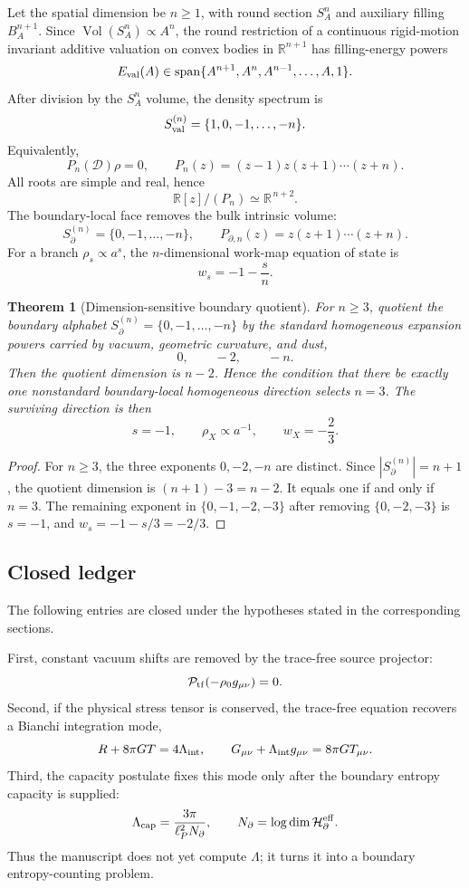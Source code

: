 \documentclass[aps,prd,reprint,nofootinbib,superscriptaddress,floatfix]{revtex4-2}
\numberwithin{equation}{section}
\theoremstyle{definition}
\theoremstyle{plain}
\newtheorem{theorem}{Theorem}[section]
\newcommand{\Dil}{\mathscr D}
\newcommand{\vol}{\operatorname{Vol}}
\newcommand{\spanop}{\operatorname{span}}
\newcommand{\Ptr}{\mathcal P_{\rm tf}}
\begin{document}
Let the spatial dimension be \(n\ge1\), with round section \(S^n_A\) and
auxiliary filling \(B^{n+1}_A\).  Since \(\vol(S^n_A)\propto A^n\), the
round restriction of a continuous rigid-motion invariant additive valuation
on convex bodies in \(\mathbb R^{n+1}\) has filling-energy powers
\[
E_{\rm val}(A)\in
\spanop\{A^{n+1},A^n,A^{n-1},\ldots,A,1\}.
\]
After division by the \(S^n_A\) volume, the density spectrum is
\[
S_{\rm val}^{(n)}=\{1,0,-1,\ldots,-n\}.
\]
Equivalently,
\begin{equation}
\boxed{
P_n(\Dil)\rho=0,\qquad
P_n(z)=(z-1)z(z+1)\cdots(z+n).
}
\end{equation}
All roots are simple and real, hence
\[
\mathbb R[z]/(P_n)\simeq \mathbb R^{\,n+2}.
\]
The boundary-local face removes the bulk intrinsic volume:
\[
S_{\partial}^{(n)}=\{0,-1,\ldots,-n\},
\qquad
P_{\partial,n}(z)=z(z+1)\cdots(z+n).
\]
For a branch \(\rho_s\propto a^s\), the \(n\)-dimensional work-map equation
of state is
\[
w_s=-1-\frac{s}{n}.
\]

\begin{theorem}[Dimension-sensitive boundary quotient]
\label{thm:dimension-quotient}
For \(n\ge3\), quotient the boundary alphabet
\(S_{\partial}^{(n)}=\{0,-1,\ldots,-n\}\) by the standard homogeneous
expansion powers carried by vacuum, geometric curvature, and dust,
\[
0,\qquad -2,\qquad -n .
\]
Then the quotient dimension is \(n-2\).  Hence the condition that there be
exactly one nonstandard boundary-local homogeneous direction selects
\(n=3\).  The surviving direction is then
\[
\boxed{
s=-1,\qquad
\rho_X\propto a^{-1},\qquad
w_X=-\frac23 .
}
\]
\end{theorem}

\begin{proof}
For \(n\ge3\), the three exponents \(0,-2,-n\) are distinct.  Since
\(|S_{\partial}^{(n)}|=n+1\), the quotient dimension is
\((n+1)-3=n-2\).  It equals one if and only if \(n=3\).  The remaining
exponent in \(\{0,-1,-2,-3\}\) after removing \(\{0,-2,-3\}\) is \(s=-1\),
and \(w_s=-1-s/3=-2/3\).
\end{proof}

\subsection{Closed ledger}

The following entries are closed under the hypotheses stated in the
corresponding sections.

First, constant vacuum shifts are removed by the trace-free source
projector:
\[
\Ptr(-\rho_0g_{\mu\nu})=0.
\]
Second, if the physical stress tensor is conserved, the trace-free equation
recovers a Bianchi integration mode,
\[
R+8\pi GT=4\Lambda_{\rm int},
\qquad
G_{\mu\nu}+\Lambda_{\rm int}g_{\mu\nu}=8\pi GT_{\mu\nu}.
\]
Third, the capacity postulate fixes this mode only after the boundary entropy
capacity is supplied:
\[
\Lambda_{\rm cap}=\frac{3\pi}{\ell_P^2N_\partial},
\qquad
N_\partial=\log\dim \mathcal H_{\partial}^{\rm eff}.
\]
Thus the manuscript does not yet compute \(\Lambda\); it turns it into a
boundary entropy-counting problem.
\end{document}

